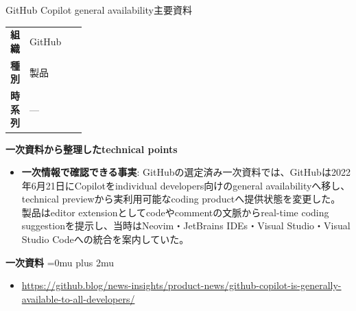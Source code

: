 \begin{technicalnote}{GitHub Copilot general availability}{主要資料}
\begingroup
\begin{tabularx}{\linewidth}{@{}>{\bfseries}p{0.22\linewidth}X@{}}
組織 & GitHub \\
種別 & 製品 \\
時系列 & — \\
\end{tabularx}
\smallskip
{\bfseries 一次資料から整理したtechnical points}
\begin{itemize}[leftmargin=1.5em,itemsep=0.35em]
\item \textbf{一次情報で確認できる事実}: GitHubの選定済み一次資料では、GitHubは2022年6月21日にCopilotをindividual developers向けのgeneral availabilityへ移し、technical previewから実利用可能なcoding productへ提供状態を変更した。 製品はeditor extensionとしてcodeやcommentの文脈からreal-time coding suggestionを提示し、当時はNeovim・JetBrains IDEs・Visual Studio・Visual Studio Codeへの統合を案内していた。
\end{itemize}
\begin{minipage}{\linewidth}
\begin{samepage}
{\bfseries 一次資料}
\begingroup\sloppy
\Urlmuskip=0mu plus 2mu\relax
\begin{itemize}[leftmargin=1.5em,itemsep=0.25em]
\item {\scriptsize\url{https://github.blog/news-insights/product-news/github-copilot-is-generally-available-to-all-developers/}}
\end{itemize}
\endgroup
\end{samepage}
\end{minipage}
\endgroup
\end{technicalnote}
\medskip

